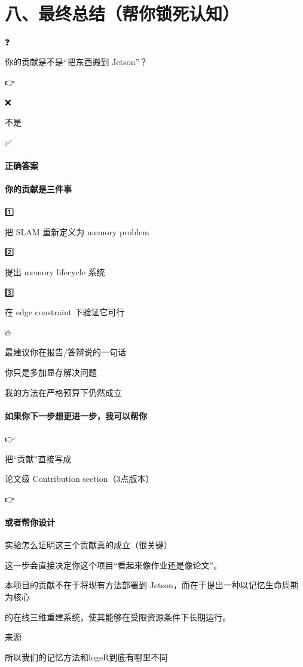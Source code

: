 \documentclass[12pt]{article}
\begin{document}
🧩

\section{八、最终总结（帮你锁死认知）}
❓

你的贡献是不是“把东西搬到 Jetson”？

👉

❌

不是

✅

\paragraph{正确答案}
\paragraph{你的贡献是三件事}
1️⃣

把 SLAM 重新定义为 memory problem

2️⃣

提出 memory lifecycle 系统

3️⃣

在 edge constraint 下验证它可行

🔥

最建议你在报告/答辩说的一句话

你只是多加显存解决问题

我的方法在严格预算下仍然成立

\paragraph{如果你下一步想更进一步，我可以帮你}
👉

把“贡献”直接写成

论文级 Contribution section（3点版本）

👉

\paragraph{或者帮你设计}
实验怎么证明这三个贡献真的成立（很关键）

这一步会直接决定你这个项目“看起来像作业还是像论文”。

本项目的贡献不在于将现有方法部署到 Jetson，而在于提出一种以记忆生命周期为核心

的在线三维重建系统，使其能够在受限资源条件下长期运行。

来源

所以我们的记忆方法和logeR到底有哪里不同
\end{document}
